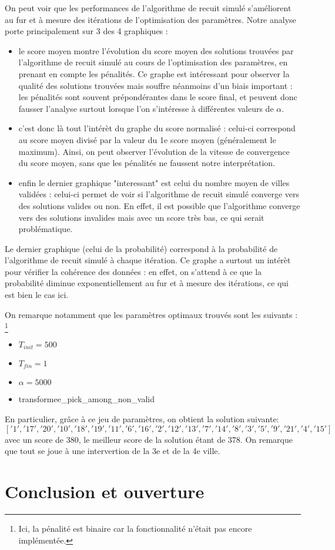 \documentclass[a4paper, 12pt]{article}
\begin{document}
On peut voir que les performances de l'algorithme de recuit simulé s'améliorent au fur et à mesure des itérations de l'optimisation des paramètres.
Notre analyse porte principalement sur 3 des 4 graphiques :
\begin{itemize}
    \item le score moyen montre l'évolution du score moyen des solutions trouvées par l'algorithme de recuit simulé au cours de l'optimisation des paramètres, en prenant en compte les pénalités.
    Ce graphe est intéressant pour observer la qualité des solutions trouvées mais souffre néanmoins d'un biais important : les pénalités sont souvent prépondérantes dans le score final, et peuvent donc fausser l'analyse surtout lorsque l'on s'intéresse à différentes valeurs de $\alpha$.
    \item c'est donc là tout l'intérèt du graphe du score normalisé : celui-ci correspond au score moyen divisé par la valeur du 1e score moyen (généralement le maximum). Ainsi, on peut observer l'évolution de la vitesse de convergence du score moyen, sans que les pénalités ne faussent notre interprétation.
    \item enfin le dernier graphique "interessant" est celui du nombre moyen de villes validées : celui-ci permet de voir si l'algorithme de recuit simulé converge vers des solutions valides ou non. En effet, il est possible que l'algorithme converge vers des solutions invalides mais avec un score très bas, ce qui serait problématique.
\end{itemize}

Le dernier graphique (celui de la probabilité) correspond à la probabilité de l'algorithme de recuit simulé à chaque itération. Ce graphe a surtout un intérèt pour vérifier la cohérence des données : en effet, on s'attend à ce que la probabilité diminue exponentiellement au fur et à mesure des itérations, ce qui est bien le cas ici.

On remarque notamment que les paramètres optimaux trouvés sont les suivants : \footnote{Ici, la pénalité est binaire car la fonctionnalité n'était pas encore implémentée.}
\begin{itemize}
    \item $T_{init} = 500$
    \item $T_{fin} = 1$
    \item $\alpha = 5000$
    \item transformee\_pick\_among\_non\_valid
\end{itemize}
En particulier, grâce à ce jeu de paramètres, on obtient la solution suivante:
$$['1', '17', '20', '10', '18', '19', '11', '6', '16', '2', '12', '13', '7', '14', '8', '3', '5', '9', '21', '4', '15']$$
avec un score de 380, le meilleur score de la solution étant de 378. On remarque que tout se joue à une intervertion de la 3e et de la 4e ville.

\section{Conclusion et ouverture}
\end{document}

